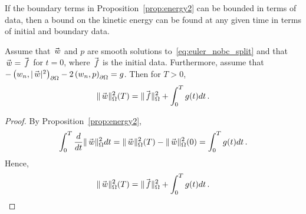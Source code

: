 If the boundary terms in Proposition~\ref{prop:energy2} can be bounded in terms of data, then a bound on the kinetic energy can be found at any given time in terms of initial and boundary data.

\begin{proposition}\label{prop:kinetic_energy_bound}
 Assume that $\wc$ and $p$ are smooth solutions to~\eqref{eq:euler_nobc_split} and that  $\wc = \vecs{f}$ for $t=0$, where $\vecs{f}$ is the initial data.
 Furthermore, assume that $-\ipbc{\wcn}{|\wc|^2} - 2\ipbc{\wcn}{p} = g$. Then for $T > 0$,
  \begin{equation*}
    \normc{\wc}^2(T) = \normc{\vecs{f}}^2 + \int_0^T g(t) dt \,.
  \end{equation*}
\end{proposition}

\begin{proof}
  By Proposition~\ref{prop:energy2},
  \begin{equation*}
    \int_0^T \frac{d}{dt} \normc{\wc}^2dt = \normc{\wc}^2(T) - \normc{\wc}^2(0) = \int_0^T g(t) dt \,.
  \end{equation*}
  Hence,
  \begin{equation*}
    \normc{\wc}^2(T) = \normc{\vecs{f}}^2 + \int_0^T g(t) dt \,.
  \end{equation*}
\end{proof}

